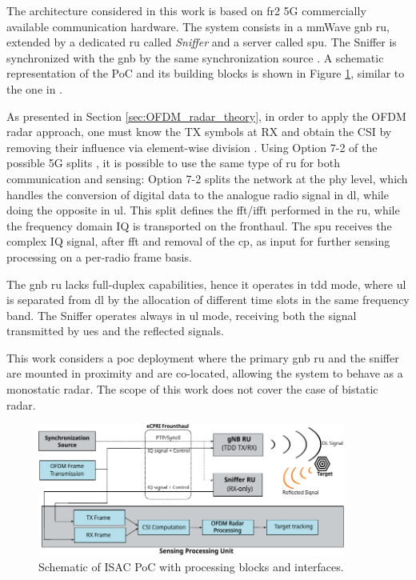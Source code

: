 The architecture considered in this work is based on \gls{fr2} 5G commercially available communication hardware.
The system consists in a mmWave \gls{gnb} \gls{ru}, extended by a dedicated \gls{ru} called \textit{Sniffer} and a server called \gls{spu}. 
The Sniffer is synchronized with the \gls{gnb} by the same synchronization source \cite{Wild_Grudnitsky_Mandelli_Henninger_Guan_Schaich_2023}. 
A schematic representation of the PoC and its building blocks is shown in Figure \ref{fig:Overview_PoC_scheme}, similar to the one in \cite{Henninger_CRAP_2023}.

As presented in Section \ref{sec:OFDM_radar_theory}, in order to apply the OFDM radar approach, one must know the TX symbols at RX and obtain the CSI by removing their influence via element-wise division \cite{Braun2014OFDMRA}. 
Using Option 7-2 of the possible 5G splits \cite{Larsen_Checko_Christiansen_2019}, it is possible to use the same type of \gls{ru} for both communication and sensing: Option 7-2 splits the network at the \gls{phy} level, which handles the conversion of digital data to the analogue radio signal in \gls{dl}, while doing the opposite in \gls{ul}.
This split defines the \gls{fft}/\gls{ifft} performed in the \gls{ru}, while the frequency domain IQ is transported on the fronthaul.
The \gls{spu} receives the complex IQ signal,  after \gls{fft} and removal of the \gls{cp}, as input for further sensing processing on a per-radio frame basis.

The \gls{gnb} \gls{ru} lacks full-duplex capabilities, hence it operates in \gls{tdd} mode, where \gls{ul} is separated from \gls{dl} by the allocation of different time slots in the same frequency band.
The Sniffer operates always in \gls{ul} mode, receiving both the signal transmitted by \glspl{ue} and the reflected signals. 

This work considers a \gls{poc} deployment where the primary \gls{gnb} \gls{ru} and the sniffer are mounted in proximity and are co-located, allowing the system to behave as a monostatic radar. 
The scope of this work does not cover the case of bistatic radar.

\begin{figure}[t]
	\centering
	\includegraphics[width=0.9\textwidth]{Images/overview/PoC_scheme.pdf}
	\caption{Schematic of ISAC PoC with processing blocks and interfaces. }
	\label{fig:Overview_PoC_scheme}
\end{figure}

